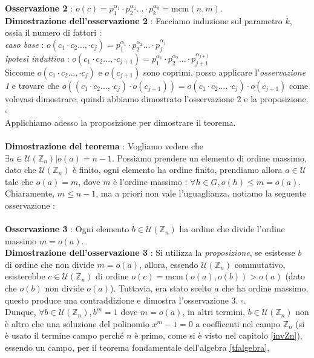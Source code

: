 \documentclass[12pt, letterpaper]{article}
\newcommand{\Z}{{\mathbb Z}}
\newcommand{\mcm}{{\text{mcm}}}
\begin{document}
\textbf{Osservazione 2} : \(o(c)=p_1^{\alpha_1}\cdot p_2^{\alpha_2}...\cdot p_k^{\alpha_k}=\mcm(n,m)\).\\
\textbf{Dimostrazione dell'osservazione 2} : Facciamo induzione sul parametro \(k\), ossia il numero di fattori :
\\ \textit{caso base} : \(o(c_1\cdot c_2...,\cdot c_j)=p_1^{\alpha_1}\cdot p_2^{\alpha_2}...\cdot p_j^{\alpha_j}\)\\
\textit{ipotesi induttiva} : \(o(c_1\cdot c_2...,\cdot c_{j+1})=p_1^{\alpha_1}\cdot p_2^{\alpha_2}...\cdot p_{j+1}^{\alpha_{j+1}}\)\\
Siccome \(o(c_1\cdot c_2...,\cdot c_j)\) e \(o(c_{j+1})\) sono coprimi, posso applicare l'\textit{osservazione 1} e trovare 
che \(o((c_1\cdot c_2...,\cdot c_j)\cdot o(c_{j+1}))=o(c_1\cdot c_2...,\cdot c_j)\cdot o(c_{j+1})\) come volevasi dimostrare, quindi abbiamo 
dimostrato l'osservazione 2 e la proposizione. \(\square\)\\
Applichiamo adesso la proposizione per dimostrare il teorema.\\\hphantom{}\\
\textbf{Dimostrazione del teorema} : Vogliamo vedere che \(\exists a\in \mathcal{U}(\Z_n)|o(a)=n-1\). Possiamo prendere 
un elemento di ordine massimo, dato che \(\mathcal{U}(\Z_n)\) è finito, ogni elemento ha ordine finito, prendiamo 
allora \(a\in \mathcal{U}\) tale che \(o(a)=m\), dove \(m\) è l'ordine massimo : \(\forall h\in G,o(h)\le m=o(a)\). Chiaramente, 
\(m\le n-1\), ma a priori non vale l'uguaglianza, notiamo la seguente osservazione :\\\hphantom{}\\
\textbf{Osservazione 3} : Ogni elemento \(b\in \mathcal{U}(\Z_n)\) ha ordine che divide l'ordine massimo \(m=o(a)\).\\
\textbf{Dimostrazione dell'osservazione 3} : Si utilizza la \textit{proposizione}, se esistesse \(b\) di ordine 
che non divide \(m=o(a)\), allora, essendo \(\mathcal{U}(\Z_n)\) commutativo, esisterebbe \(c\in\mathcal{U}(\Z_n)\) di 
ordine \(o(c)=\mcm(o(a),o(b))>o(a)\) (dato che \(o(b)\) non divide \(o(a)\)). Tuttavia, era stato scelto \(a\) che ha ordine 
massimo, questo produce una contraddizione e dimostra l'osservazione 3. \(\square\).\\
Dunque, \(\forall b\in \mathcal{U}(\Z_n), b^m=1\) dove \(m=o(a)\), in altri termini, \(b\in \mathcal{U}(\Z_n)\) non 
è altro che una soluzione del polinomio \(x^m-1=0\) a coefficenti nel campo \(\Z_n\) (si è usato il termine campo perché 
\(n\) è primo, come si è visto nel capitolo \ref{invZn}), essendo un campo, per il teorema fondamentale dell'algebra \ref{tfalgebra}, 
\end{document}
